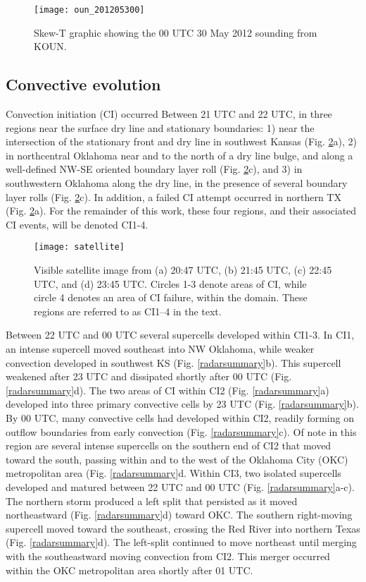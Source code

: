 \begin{figure}
\centering
\texttt{[image: oun\_201205300]}
\caption{Skew-T graphic showing the 00 UTC 30 May 2012 sounding from KOUN.}
\label{skewt}
\end{figure}

\subsection{Convective evolution}
Convection initiation (CI) occurred Between 21 UTC and 22 UTC, in three regions near the surface dry line and stationary boundaries: 1) near the intersection of the stationary front and dry line in southwest Kansas (Fig. \ref{satellite}a), 2) in northcentral Oklahoma near and to the north of a dry line bulge, and along a well-defined NW-SE oriented boundary layer roll (Fig. \ref{satellite}c), and 3) in southwestern Oklahoma along the dry line, in the presence of several boundary layer rolls (Fig. \ref{satellite}c). In addition, a failed CI attempt occurred in northern TX (Fig. \ref{satellite}a). For the remainder of this work, these four regions, and their associated CI events, will be denoted CI1-4.

\begin{figure}
\centering
\texttt{[image: satellite]}
\caption{Visible satellite image from (a) 20:47 UTC, (b) 21:45 UTC, (c) 22:45 UTC, and (d) 23:45 UTC. Circles 1-3 denote areas of CI, while circle 4 denotes an area of CI failure, within the domain. These regions are referred to as CI1--4 in the text.}
\label{satellite}
\end{figure}

Between 22 UTC and 00 UTC several supercells developed within CI1-3. In CI1, an intense supercell moved southeast into NW Oklahoma, while weaker convection developed in southwest KS (Fig. \ref{radarsummary}b). This supercell weakened after 23 UTC and dissipated shortly after 00 UTC (Fig. \ref{radarsummary}d). The two areas of CI within CI2 (Fig. \ref{radarsummary}a) developed into three primary convective cells by 23 UTC (Fig. \ref{radarsummary}b). By 00 UTC, many convective cells had developed within CI2, readily forming on outflow boundaries from early convection (Fig. \ref{radarsummary}c). Of note in this region are several intense supercells on the southern end of CI2 that moved toward the south, passing within and to the west of the Oklahoma City (OKC) metropolitan area (Fig. \ref{radarsummary}d. Within CI3, two isolated supercells developed and matured between 22 UTC and 00 UTC (Fig. \ref{radarsummary}a-c). The northern storm produced a left split that persisted as it moved northeastward (Fig. \ref{radarsummary}d) toward OKC. The southern right-moving supercell moved toward the southeast, crossing the Red River into northern Texas (Fig. \ref{radarsummary}d). The left-split continued to move northeast until merging with the southeastward moving convection from CI2. This merger occurred within the OKC metropolitan area shortly after 01 UTC.

